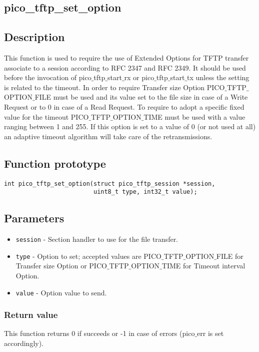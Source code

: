 \subsection{pico\_tftp\_set\_option}

\subsection*{Description}
This function is used to require the use of Extended Options for TFTP transfer associate to a session according to RFC 2347 and RFC 2349. It should be used before the invocation of pico$\_$tftp$\_$start$\_$rx or pico$\_$tftp$\_$start$\_$tx unless the setting is related to the timeout.
In order to require Transfer size Option PICO$\_$TFTP$\_$OPTION$\_$FILE must be used and its value set to the file size in case of a Write Request or to 0 in case of a Read Request.
To require to adopt a specific fixed value for the timeout PICO$\_$TFTP$\_$OPTION$\_$TIME must be used with a value ranging between 1 and 255. If this option is set to a value of 0 (or not used at all) an adaptive timeout algorithm will take care of the retransmissions.

\subsection*{Function prototype}
\begin{verbatim}
int pico_tftp_set_option(struct pico_tftp_session *session,
                         uint8_t type, int32_t value);
\end{verbatim}

\subsection*{Parameters}
\begin{itemize}[noitemsep]
\item \texttt{session} - Section handler to use for the file transfer.
\item \texttt{type} - Option to set; accepted values are PICO$\_$TFTP$\_$OPTION$\_$FILE for Transfer size Option or PICO$\_$TFTP$\_$OPTION$\_$TIME for Timeout interval Option.
\item \texttt{value} - Option value to send.
\end{itemize}

\subsubsection*{Return value}
This function returns 0 if succeeds or -1 in case of errors (pico$\_$err is set accordingly).

